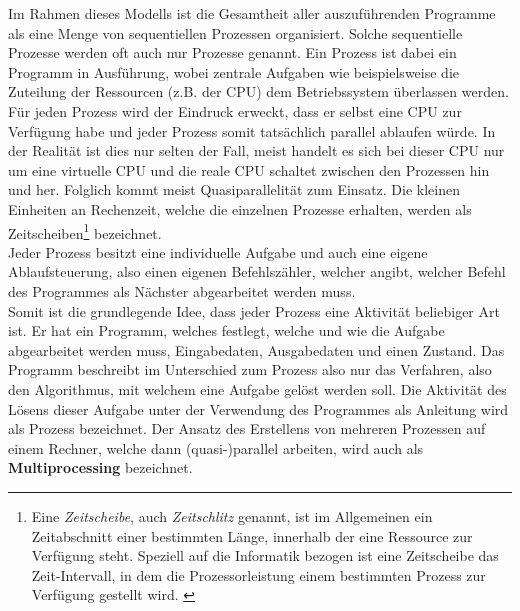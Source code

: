 				Im Rahmen dieses Modells ist die Gesamtheit aller auszuführenden Programme als eine Menge von sequentiellen Prozessen organisiert. Solche sequentielle Prozesse werden oft auch nur Prozesse genannt.
				Ein Prozess ist dabei ein Programm in Ausführung, wobei zentrale Aufgaben wie beispielsweise die Zuteilung der Ressourcen (z.B. der CPU) dem Betriebssystem überlassen werden.\\
				Für jeden Prozess wird der Eindruck erweckt, dass er selbst eine CPU zur Verfügung habe und jeder Prozess somit tatsächlich parallel ablaufen würde. In der Realität ist dies nur selten der Fall, meist handelt es sich bei dieser CPU nur um eine virtuelle CPU und die reale CPU schaltet zwischen den Prozessen hin und her. Folglich kommt meist Quasiparallelität zum Einsatz. Die kleinen Einheiten an Rechenzeit, welche die einzelnen Prozesse erhalten, werden als Zeitscheiben\footnote{Eine \textit{Zeitscheibe}, auch \textit{Zeitschlitz} genannt, ist im Allgemeinen ein Zeitabschnitt einer bestimmten Länge, innerhalb der eine Ressource zur Verfügung steht. Speziell auf die Informatik bezogen ist eine Zeitscheibe das Zeit-Intervall, in dem die Prozessorleistung einem bestimmten Prozess zur Verfügung gestellt wird. \cite{ZeitschlitzWikipedia}} bezeichnet.\\
				Jeder Prozess besitzt eine individuelle Aufgabe und auch eine eigene Ablaufsteuerung, also einen eigenen Befehlszähler, welcher angibt, welcher Befehl des Programmes als Nächster abgearbeitet werden muss.\\
				Somit ist die grundlegende Idee, dass jeder Prozess eine Aktivität beliebiger Art ist. Er hat ein Programm, welches festlegt, welche und wie die Aufgabe abgearbeitet werden muss, Eingabedaten, Ausgabedaten und einen Zustand.
				Das Programm beschreibt im Unterschied zum Prozess also nur das Verfahren, also den Algorithmus, mit welchem eine Aufgabe gelöst werden soll. Die Aktivität des Lösens dieser Aufgabe unter der Verwendung des Programmes als Anleitung wird als Prozess bezeichnet.
				Der Ansatz des Erstellens von mehreren Prozessen auf einem Rechner, welche dann (quasi-)parallel arbeiten, wird auch als \textbf{Multiprocessing} bezeichnet. \cite{ModerneBetriebssysteme}
				
